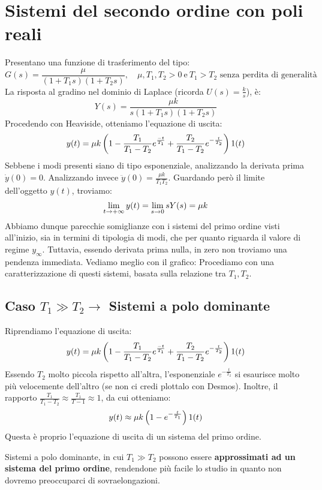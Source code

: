 \section{Sistemi del secondo ordine con poli reali}
Presentano una funzione di trasferimento del tipo:
\begin{equation}
G(s) = \frac{\mu}{(1+T_1s)(1+T_2s)}, \quad \mu, T_1, T_2 > 0 \ \textrm{e} \ T_1 > T_2 \textrm{ senza perdita di generalità}
\end{equation}
La risposta al gradino nel dominio di Laplace (ricorda $U(s) = \frac{k}{s}$), è:
\begin{equation*}
Y(s) = \frac{\mu k}{s(1+T_1 s) (1+T_2s)}
\end{equation*}
Procedendo con Heaviside, otteniamo l'equazione di uscita:
\begin{equation}
y(t) = \mu k\left( 1 - \frac{T_1}{T_1 - T_2}e^{\frac{-t}{T_1}} + \frac{T_2}{T_1-T_2}e^{-\frac{t}{T_2}} \right)1(t)
\end{equation}
Sebbene i modi presenti siano di tipo esponenziale, analizzando la derivata prima $\dot y(0) = 0$. Analizzando invece $\ddot y(0) = \frac{\mu k}{T_1T_2}$. Guardando però il limite dell'oggetto $y(t)$, troviamo:
\begin{equation}
\lim_{t \rightarrow +\infty} y(t) = \lim_{s \rightarrow 0} sY(s) = \mu k
\end{equation}
Abbiamo dunque parecchie somiglianze con i sistemi del primo ordine visti all'inizio, sia in termini di tipologia di modi, che per quanto riguarda il valore di regime $y_\infty$. Tuttavia, essendo derivata prima nulla, in zero non troviamo una pendenza immediata. Vediamo meglio con il grafico:
\bb
Procediamo con una caratterizzazione di questi sistemi, basata sulla relazione tra $T_1, T_2$.

\subsection{Caso $T_1 \gg T_2 \rightarrow $ Sistemi a polo dominante}
Riprendiamo l'equazione di uscita:
\begin{equation*}
y(t) = \mu k\left( 1 - \frac{T_1}{T_1 - T_2}e^{\frac{-t}{T_1}} + \frac{T_2}{T_1-T_2}e^{-\frac{t}{T_2}} \right)1(t)
\end{equation*}
Essendo $T_2$ molto piccola rispetto all'altra, l'esponenziale $e^{-\frac{t}{T_2}}$ si esaurisce molto più velocemente dell'altro (se non ci credi plottalo con Desmos). Inoltre, il rapporto $\frac{T_1}{T_1 - T_2} \approx \frac{T_1}{T-1} \approx 1$, da cui otteniamo:
\begin{equation}
y(t) \approx \mu k \left( 1-e^{-\frac{t}{T_1}} \right)1(t)
\end{equation}
Questa è proprio l'equazione di uscita di un sistema del primo ordine.
\begin{defin}{}{}
Sistemi a polo dominante, in cui $T_1 \gg T_2$ possono essere \textbf{approssimati ad un sistema del primo ordine}, rendendone più facile lo studio in quanto non dovremo preoccuparci di sovraelongazioni.
\end{defin}
